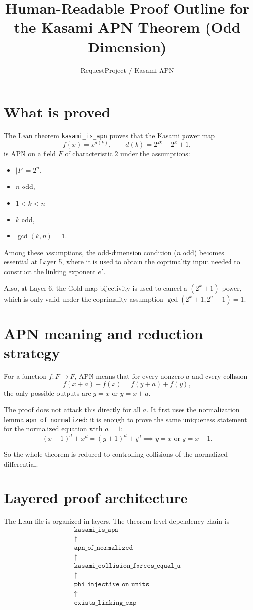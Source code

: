 \documentclass[11pt]{article}
\title{Human-Readable Proof Outline for the Kasami APN Theorem (Odd Dimension)}
\author{RequestProject / Kasami APN}
\date{}
\begin{document}
\maketitle

\section{What is proved}
The Lean theorem \texttt{kasami\_is\_apn} proves that the Kasami power map
\[
  f(x) = x^{d(k)}, \qquad d(k)=2^{2k}-2^k+1,
\]
is APN on a field $F$ of characteristic $2$ under the assumptions:
\begin{itemize}
  \item $|F|=2^n$,
  \item $n$ odd,
  \item $1<k<n$,
  \item $k$ odd,
  \item $\gcd(k,n)=1$.
\end{itemize}

Among these assumptions, the odd-dimension condition ($n$ odd) becomes essential at Layer 5,
where it is used to obtain the coprimality input needed to construct the linking exponent $e'$. 

Also, at Layer 6, the Gold-map bijectivity is used to cancel a $(2^k+1)$-power, which is only valid under the coprimality assumption $\gcd(2^k+1,2^n-1)=1$.

\section{APN meaning and reduction strategy}
For a function $f:F\to F$, APN means that for every nonzero $a$ and every collision
\[
  f(x+a)+f(x)=f(y+a)+f(y),
\]
the only possible outputs are $y=x$ or $y=x+a$.

The proof does not attack this directly for all $a$. It first uses the normalization lemma
\texttt{apn\_of\_normalized}: it is enough to prove the same uniqueness statement for the
normalized equation with $a=1$:
\[
  (x+1)^d+x^d=(y+1)^d+y^d \implies y=x \text{ or } y=x+1.
\]

So the whole theorem is reduced to controlling collisions of the normalized differential.

\section{Layered proof architecture}
The Lean file is organized in layers. The theorem-level dependency chain is:
\[
\begin{array}{c}
\texttt{kasami\_is\_apn} \\
\uparrow \\
\texttt{apn\_of\_normalized} \\
\uparrow \\
\texttt{kasami\_collision\_forces\_equal\_u} \\
\uparrow \\
\texttt{phi\_injective\_on\_units} \\
\uparrow \\
\texttt{exists\_linking\_exp}
\end{array}
\]
\end{document}
